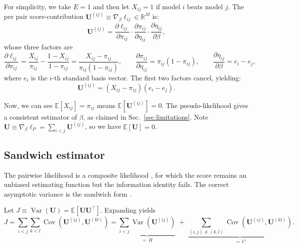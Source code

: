 \documentclass{article}
\DeclareMathOperator{\Var}{Var}
\DeclareMathOperator{\Cov}{Cov}
\begin{document}
For simplicity, we take $E = 1$ and then let $X_{ij} = 1$ if model $i$ beats model $j$. The per pair score-contribution $\mathbf{U}^{(ij)} \equiv \nabla_\beta \ell_{ij} \in \mathbb{R}^M$ is:
\begin{equation}
  \mathbf{U}^{(ij)}
  = \frac{\partial \ell_{ij}}{\partial \pi_{ij}}
    \cdot \frac{\partial \pi_{ij}}{\partial \eta_{ij}}
    \cdot \frac{\partial \eta_{ij}}{\partial \beta},
\end{equation}
whose three factors are
\begin{equation}
  \frac{\partial \ell_{ij}}{\partial \pi_{ij}}
    = \frac{X_{ij}}{\pi_{ij}} - \frac{1 - X_{ij}}{1 - \pi_{ij}}
    = \frac{X_{ij} - \pi_{ij}}{\pi_{ij}(1 - \pi_{ij})},
  \qquad
  \frac{\partial \pi_{ij}}{\partial \eta_{ij}} = \pi_{ij}(1 - \pi_{ij}),
  \qquad
  \frac{\partial \eta_{ij}}{\partial \beta} = e_i - e_j,
\end{equation} where $e_i$ is the $i$-th standard basis vector. The first two factors cancel, yielding:
\begin{equation}
  \mathbf{U}^{(ij)} = (X_{ij} - \pi_{ij})(e_i - e_j).
  \label{eq:score-pair}
\end{equation}

Now, we can see $\mathbb{E}[X_{ij}] = \pi_{ij}$ means $\mathbb{E}[\mathbf{U}^{(ij)}] = 0$. The pseudo-likelihood gives a consistent estimator of $\beta$, as claimed in Sec.~\ref{sec:limitations}. Note $\mathbf{U} \equiv \nabla_\beta \ell_P = \sum_{i<j} \mathbf{U}^{(ij)}$, so we have $\mathbb{E}[\mathbf{U}] = 0$.

\subsection{Sandwich estimator}

The pairwise likelihood is a composite likelihood \citep{lindsay1988, varin2011},
for which the score remains an unbiased estimating function \citep{godambe1960}
but the information identity fails. The correct asymptotic variance is the
sandwich form \citep{white1982, kauermann2001}.

Let $J \equiv \Var(\mathbf{U}) = \mathbb{E}[\mathbf{U}\mathbf{U}^\top]$. Expanding yields \begin{equation}
  J = \sum_{i<j}\sum_{k<l} \Cov\!\left(\mathbf{U}^{(ij)}, \mathbf{U}^{(kl)}\right)
    = \underbrace{\sum_{i<j} \Var\!\left(\mathbf{U}^{(ij)}\right)}_{=\,H}
      \;+\; \underbrace{\sum_{(i,j) \neq (k,l)} \Cov\!\left(\mathbf{U}^{(ij)}, \mathbf{U}^{(kl)}\right)}_{=\,C}.
\end{equation}
\end{document}
